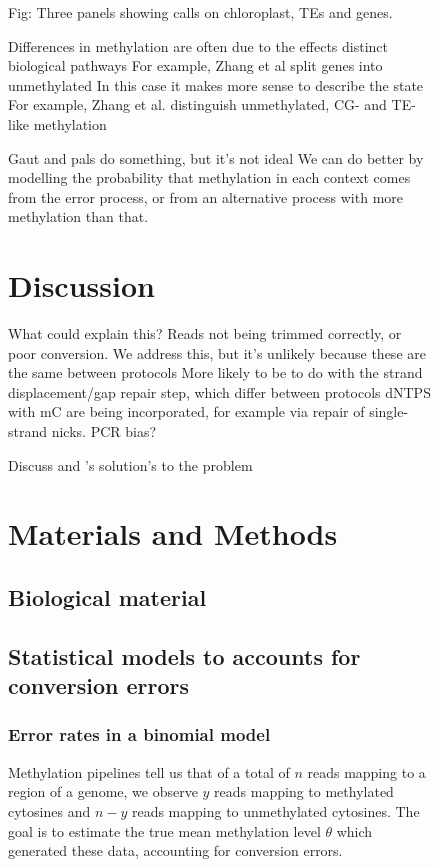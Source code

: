 \documentclass[12pt,longbibliography]{article}
\begin{document}
\begin{figure}
Fig: Three panels showing calls on chloroplast, TEs and genes.

Differences in methylation are often due to the effects distinct biological pathways
For example, Zhang et al split genes into unmethylated 
In this case it makes more sense to describe the state
For example, Zhang et al. distinguish unmethylated, CG- and TE-like methylation

Gaut and pals do something, but it's not ideal
We can do better by modelling the probability that methylation in each context
comes from the error process, or from an alternative process with more methylation
than that.



\section{Discussion}


What could explain this?
Reads not being trimmed correctly, or poor conversion.
We address this, but it's unlikely because these are the same between protocols
More likely to be to do with the strand displacement/gap repair step, which differ between protocols
dNTPS with mC are being incorporated, for example via repair of single-strand nicks.
PCR bias?


Discuss \cite{lu2015improved} and \cite{suzuki2018whole}'s solution's to the problem

\section{Materials and Methods}

\subsection{Biological material}

\subsection{Statistical models to accounts for conversion errors}

\subsubsection{Error rates in a binomial model}

Methylation pipelines tell us that of a total of $n$ reads mapping to a region of a genome, we observe $y$ reads mapping to methylated cytosines and $n-y$ reads mapping to unmethylated cytosines. The goal is to estimate the true mean methylation level $\theta$ which generated these data, accounting for conversion errors.


\end{figure}
\end{document}
